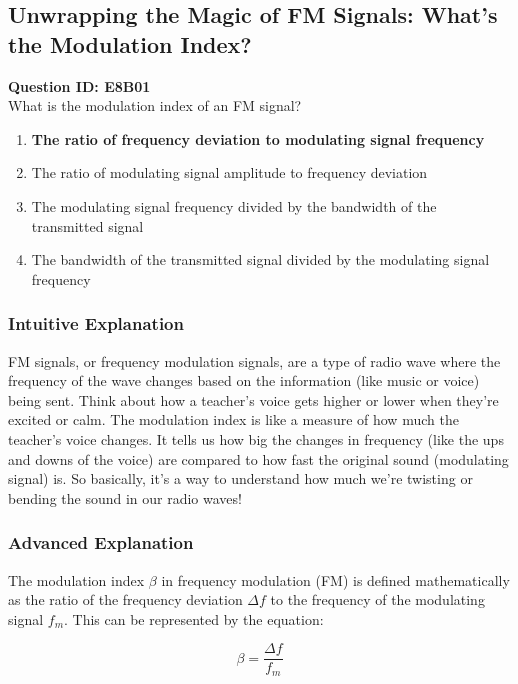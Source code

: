 \subsection{Unwrapping the Magic of FM Signals: What's the Modulation Index?}

\begin{tcolorbox}
\textbf{Question ID: E8B01} \\
What is the modulation index of an FM signal? \\
\begin{enumerate}[label=\Alph*.]
    \item \textbf{The ratio of frequency deviation to modulating signal frequency}
    \item The ratio of modulating signal amplitude to frequency deviation
    \item The modulating signal frequency divided by the bandwidth of the transmitted signal
    \item The bandwidth of the transmitted signal divided by the modulating signal frequency
\end{enumerate}
\end{tcolorbox}

\subsubsection{Intuitive Explanation}
FM signals, or frequency modulation signals, are a type of radio wave where the frequency of the wave changes based on the information (like music or voice) being sent. Think about how a teacher's voice gets higher or lower when they're excited or calm. The modulation index is like a measure of how much the teacher's voice changes. It tells us how big the changes in frequency (like the ups and downs of the voice) are compared to how fast the original sound (modulating signal) is. So basically, it’s a way to understand how much we're twisting or bending the sound in our radio waves!

\subsubsection{Advanced Explanation}
The modulation index \( \beta \) in frequency modulation (FM) is defined mathematically as the ratio of the frequency deviation \( \Delta f \) to the frequency of the modulating signal \( f_m \). This can be represented by the equation:

\[
\beta = \frac{\Delta f}{f_m}
\]

